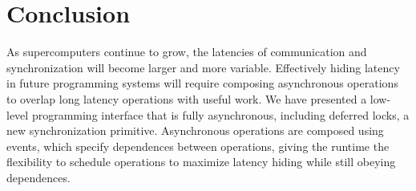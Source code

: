 
\section{Conclusion}
\label{sec:conclusion}

As supercomputers continue to grow, the latencies of communication and
synchronization will become larger and more variable.  Effectively
hiding latency in future programming systems will require composing
asynchronous operations to overlap long latency operations with useful
work.  We have presented a low-level programming interface that is
fully asynchronous, including deferred locks, a new synchronization
primitive.  Asynchronous operations are composed using events, which
specify dependences between operations, giving the
runtime the flexibility to schedule operations to maximize latency
hiding while still obeying dependences.




